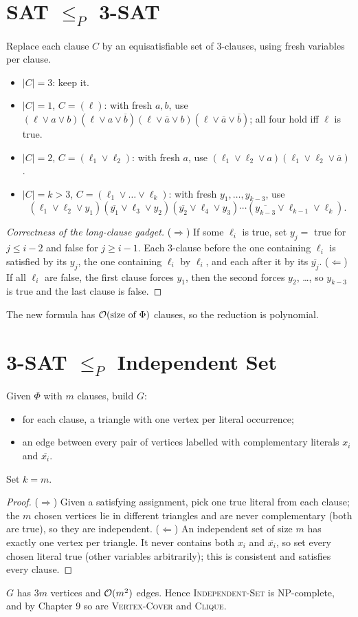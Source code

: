\section{SAT \texorpdfstring{$\le_P$}{<=} 3-SAT}
Replace each clause $C$ by an equisatisfiable set of 3-clauses, using fresh variables per clause.
\begin{itemize}
  \item $|C|=3$: keep it.
  \item $|C|=1$, $C=(\ell)$: with fresh $a,b$, use $(\ell\lor a\lor b)(\ell\lor a\lor\overline b)(\ell\lor\overline a\lor b)(\ell\lor\overline a\lor\overline b)$; all four hold iff $\ell$ is true.
  \item $|C|=2$, $C=(\ell_1\lor\ell_2)$: with fresh $a$, use $(\ell_1\lor\ell_2\lor a)(\ell_1\lor\ell_2\lor\overline a)$.
  \item $|C|=k>3$, $C=(\ell_1\lor\dots\lor\ell_k)$: with fresh $y_1,\dots,y_{k-3}$, use
  \[
  (\ell_1\lor\ell_2\lor y_1)(\overline{y_1}\lor\ell_3\lor y_2)(\overline{y_2}\lor\ell_4\lor y_3)\cdots(\overline{y_{k-3}}\lor\ell_{k-1}\lor\ell_k).
  \]
\end{itemize}
\begin{proof}[Correctness of the long-clause gadget]
($\Rightarrow$) If some $\ell_i$ is true, set $y_j=$ true for $j\le i-2$ and false for $j\ge i-1$. Each 3-clause before the one containing $\ell_i$ is satisfied by its
$y_j$, the one containing $\ell_i$ by $\ell_i$, and each after it by its $\overline{y_j}$.
($\Leftarrow$) If all $\ell_i$ are false, the first clause forces $y_1$, then the second forces $y_2$, \dots, so $y_{k-3}$ is true and the last clause is false.
\end{proof}
The new formula has $\mathcal{O}(\text{size of }\Phi)$ clauses, so the reduction is polynomial.

\section{3-SAT \texorpdfstring{$\le_P$}{<=} Independent Set}
Given $\Phi$ with $m$ clauses, build $G$:
\begin{itemize}
  \item for each clause, a triangle with one vertex per literal occurrence;
  \item an edge between every pair of vertices labelled with complementary literals $x_i$ and $\overline{x_i}$.
\end{itemize}
Set $k=m$.
\begin{proof}
($\Rightarrow$) Given a satisfying assignment, pick one true literal from each clause; the $m$ chosen vertices lie in different triangles and are never complementary
(both are true), so they are independent.
($\Leftarrow$) An independent set of size $m$ has exactly one vertex per triangle. It never contains both $x_i$ and $\overline{x_i}$, so set every chosen literal
true (other variables arbitrarily); this is consistent and satisfies every clause.
\end{proof}
$G$ has $3m$ vertices and $\mathcal{O}(m^2)$ edges. Hence \textsc{Independent-Set} is NP-complete, and by Chapter 9 so are \textsc{Vertex-Cover} and \textsc{Clique}.

